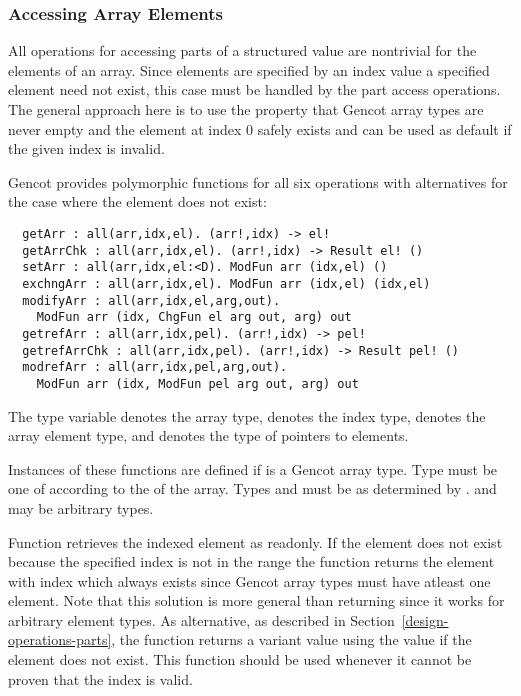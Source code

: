 \subsubsection{Accessing Array Elements}

All operations for accessing parts of a structured value are nontrivial for the elements of an array. Since elements are 
specified by an index value a specified element need not exist, this case must be handled by the part access operations.
The general approach here is to use the property that Gencot array types are never empty and the element at index 0 safely
exists and can be used as default if the given index is invalid.

Gencot provides polymorphic functions for all six operations with alternatives for the case where the element does not 
exist:
\begin{verbatim}
  getArr : all(arr,idx,el). (arr!,idx) -> el!
  getArrChk : all(arr,idx,el). (arr!,idx) -> Result el! ()
  setArr : all(arr,idx,el:<D). ModFun arr (idx,el) ()
  exchngArr : all(arr,idx,el). ModFun arr (idx,el) (idx,el)
  modifyArr : all(arr,idx,el,arg,out). 
    ModFun arr (idx, ChgFun el arg out, arg) out
  getrefArr : all(arr,idx,pel). (arr!,idx) -> pel!
  getrefArrChk : all(arr,idx,pel). (arr!,idx) -> Result pel! ()
  modrefArr : all(arr,idx,pel,arg,out). 
    ModFun arr (idx, ModFun pel arg out, arg) out
\end{verbatim}
The type variable  denotes the array type,  denotes the index type,
 denotes the array element type, and  denotes the type of pointers to elements. 

Instances of these functions are defined if  is a Gencot array type. Type 
must be one of  according to the  of the array. Types  and
 must be as determined by .  and  may be arbitrary types.

Function  retrieves the indexed element as readonly. If the element does not exist because
the specified index is not in the range  the function returns the element with 
index  which always exists since Gencot array types must have atleast one element. Note that
this solution is more general than returning  since it works for arbitrary element types.
As alternative, as described in Section~\ref{design-operations-parts}, the function
 returns a variant value using the value  if the element does not exist.
This function should be used whenever it cannot be proven that the index is valid.

